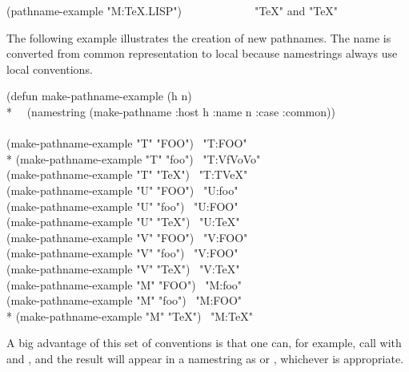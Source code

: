 \begin{newer}
\begin{lisp}
(pathname-example "M:TeX.LISP")~~~~~~~~~~~~\EV\ "TeX" {\rm and} "TeX"
\end{lisp}
The following example illustrates the creation of new pathnames.
The name is converted from common representation to local because
namestrings always use local conventions.
\begin{lisp}
(defun make-pathname-example (h n) \\*
~~(namestring (make-pathname :host h :name n :case :common)) \\
\\
(make-pathname-example "T" "FOO") \EV\ "T:FOO" \\*
(make-pathname-example "T" "foo") \EV\ "T:{\Xcircumflex}Vf{\Xcircumflex}Vo{\Xcircumflex}Vo" \\
(make-pathname-example "T" "TeX") \EV\ "T:T{\Xcircumflex}VeX" \\
(make-pathname-example "U" "FOO") \EV\ "U:foo" \\
(make-pathname-example "U" "foo") \EV\ "U:FOO" \\
(make-pathname-example "U" "TeX") \EV\ "U:TeX" \\
(make-pathname-example "V" "FOO") \EV\ "V:FOO" \\
(make-pathname-example "V" "foo") \EV\ "V:FOO" \\
(make-pathname-example "V" "TeX") \EV\ "V:TeX" \\
(make-pathname-example "M" "FOO") \EV\ "M:foo" \\
(make-pathname-example "M" "foo") \EV\ "M:FOO" \\*
(make-pathname-example "M" "TeX") \EV\ "M:TeX"
\end{lisp}
A big advantage of this set of conventions is that one can, for example,
call  with  and ,
and the result will appear in a namestring as  or ,
whichever is appropriate.
\end{newer}

